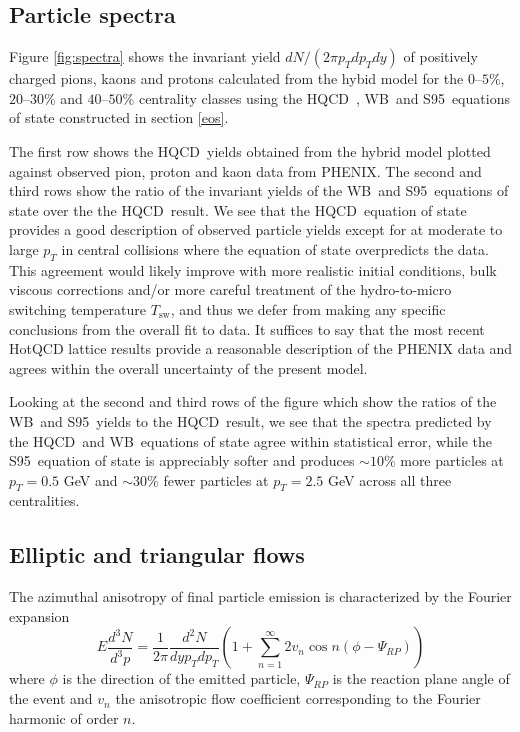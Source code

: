 \documentclass[aps,prc,reprint,amsmath,nofootinbib,superscriptaddress]{revtex4-1}
\newcommand{\hotqcd}{HQCD~}
\newcommand{\wb}{WB~}
\newcommand{\spv}{S95~}
\begin{document}
\subsection{Particle spectra}
\label{spectra}

Figure \ref{fig:spectra} shows the invariant yield $dN/(2\pi p_T dp_T dy)$ of positively charged pions, kaons and protons calculated from the hybid model for the $0$--$5\%$, $20$--$30\%$
and $40$--$50\%$ centrality classes using the \hotqcd, \wb and \spv equations of state constructed in section \ref{eos}. 

The first row shows the \hotqcd yields obtained from the hybrid model plotted against observed pion, proton and kaon data from PHENIX. The second and third rows show the ratio of the invariant yields of 
the \wb and \spv equations of state over the the \hotqcd result. We see that the \hotqcd equation of state provides a good description of observed particle yields except for at moderate 
to large $p_T$ in central collisions where the equation of state overpredicts the data. This agreement would likely improve with more realistic initial conditions, bulk viscous corrections 
and/or more careful treatment of the hydro-to-micro switching temperature $T_\text{sw}$, and thus we defer from making any specific conclusions from the overall fit to data. It suffices to say that the 
most recent HotQCD lattice results provide a reasonable description of the PHENIX data and agrees within the overall uncertainty of the present model. 

Looking at the second and third rows of the figure which show the ratios of the \wb and \spv yields to the \hotqcd result, we see that the spectra predicted by the \hotqcd and \wb equations of state 
agree within statistical error, while the \spv equation of state is appreciably softer and produces $\sim 10\%$ more particles at $p_T = 0.5$ GeV and $\sim 30\%$ fewer particles at $p_T=2.5$ GeV across all three centralities.

\subsection{Elliptic and triangular flows}
\label{flow}

The azimuthal anisotropy of final particle emission is characterized by the Fourier expansion
\begin{equation}
 E \frac{d^3N}{d^3p} = \frac{1}{2\pi} \frac{d^2N}{dy p_T dp_T} \left(1 + \sum\limits_{n=1}^\infty 2 v_n \cos n(\phi - \Psi_{RP}) \right)
\end{equation}
where $\phi$ is the direction of the emitted particle, $\Psi_{RP}$ is the reaction plane angle of the event and $v_n$ the anisotropic flow coefficient corresponding to the Fourier harmonic of order $n$.
\end{document}
